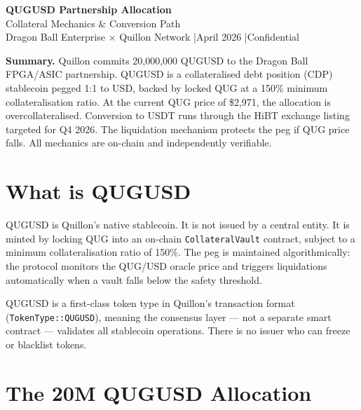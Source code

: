 \documentclass[11pt,a4paper]{article}
\begin{document}
\begin{center}
  {\LARGE\bfseries QUGUSD Partnership Allocation}\\[0.4em]
  {\large\color{qugblue} Collateral Mechanics \& Conversion Path}\\[0.6em]
  {\small Dragon Ball Enterprise $\times$ Quillon Network \quad|\quad April 2026 \quad|\quad Confidential}
\end{center}

\vspace{0.5em}
\begin{mdframed}[backgroundcolor=lightgray, linecolor=qugblue, linewidth=1pt]
\small
\textbf{Summary.} Quillon commits 20,000,000 QUGUSD to the Dragon Ball FPGA/ASIC partnership.
QUGUSD is a collateralised debt position (CDP) stablecoin pegged 1:1 to USD,
backed by locked QUG at a 150\% minimum collateralisation ratio.
At the current QUG price of \$2,971, the allocation is overcollateralised.
Conversion to USDT runs through the HiBT exchange listing targeted for Q4 2026.
The liquidation mechanism protects the peg if QUG price falls.
All mechanics are on-chain and independently verifiable.
\end{mdframed}

\vspace{1em}

\section{What is QUGUSD}

QUGUSD is Quillon's native stablecoin. It is not issued by a central entity.
It is minted by locking QUG into an on-chain \texttt{CollateralVault} contract,
subject to a minimum collateralisation ratio of 150\%.
The peg is maintained algorithmically: the protocol monitors the QUG/USD oracle
price and triggers liquidations automatically when a vault falls below the
safety threshold.

QUGUSD is a first-class token type in Quillon's transaction format
(\texttt{TokenType::QUGUSD}), meaning the consensus layer — not a separate
smart contract — validates all stablecoin operations.
There is no issuer who can freeze or blacklist tokens.

\section{The 20M QUGUSD Allocation}
\end{document}
